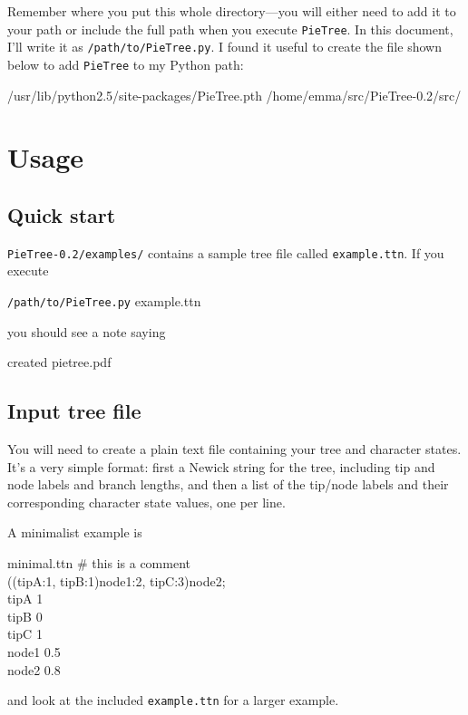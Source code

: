 \documentclass[10pt]{article}
\newcommand{\PT}{\texttt{PieTree}\xspace}
\newcommand{\PTpath}{\texttt{/path/to/PieTree.py}\xspace}
\begin{document}
Remember where you put this whole directory---you will either need to add it to your path or include the full path when you execute \PT.  In this document, I'll write it as \PTpath.
I found it useful to create the file shown below to add \PT to my Python path:
\begin{filesays}{/usr/lib/python2.5/site-packages/PieTree.pth}
	/home/emma/src/PieTree-0.2/src/
\end{filesays}



\section*{Usage}

\subsection*{Quick start}

\texttt{PieTree-0.2/examples/} contains a sample tree file called \texttt{example.ttn}.
If you execute
\begin{commandis}
	\PTpath example.ttn
\end{commandis}
you should see a note saying
\begin{commandis}
	created pietree.pdf
\end{commandis}


\subsection*{Input tree file}

You will need to create a plain text file containing your tree and character states.
It's a very simple format: first a Newick string for the tree, including tip and node labels and branch lengths, and then a list of the tip/node labels and their corresponding character state values, one per line.

A minimalist example is

\pagebreak

\begin{filesays}{minimal.ttn}
	\# this is a comment   \\
	((tipA:1, tipB:1)node1:2, tipC:3)node2; \\
	tipA   1		\\
	tipB   0		\\
	tipC   1		\\
	node1  0.5	\\
	node2  0.8
\end{filesays}
and look at the included \texttt{example.ttn} for a larger example.
\end{document}
